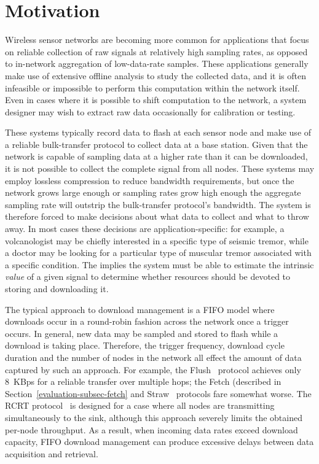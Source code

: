 \section{Motivation}
\label{lance-sec-motivation}

Wireless sensor networks are becoming more common for applications that focus
on reliable collection of raw signals at relatively high sampling rates, as
opposed to in-network aggregation of low-data-rate samples. These
applications generally make use of extensive offline analysis to study the
collected data, and it is often infeasible or impossible to perform this
computation within the network itself. Even in cases where it is possible to
shift computation to the network, a system designer may wish to extract raw
data occasionally for calibration or testing.

These systems typically record data to flash at each sensor node and make use
of a reliable bulk-transfer protocol to collect data at a base station. Given
that the network is capable of sampling data at a higher rate than it can be
downloaded, it is not possible to collect the complete signal from all nodes.
These systems may employ lossless compression to reduce bandwidth
requirements, but once the network grows large enough or sampling rates grow
high enough the aggregate sampling rate will outstrip the bulk-transfer
protocol's bandwidth. The system is therefore forced to make decisions about
what data to collect and what to throw away. In most cases these decisions
are application-specific: for example, a volcanologist may be chiefly
interested in a specific type of seismic tremor, while a doctor may be
looking for a particular type of muscular tremor associated with a specific
condition. The implies the system must be able to estimate the intrinsic
\textit{value} of a given signal to determine whether resources should be
devoted to storing and downloading it.

The typical approach to download management is a FIFO model where downloads
occur in a round-robin fashion across the network once a trigger occurs. In
general, new data may be sampled and stored to flash while a download is
taking place. Therefore, the trigger frequency, download cycle duration and
the number of nodes in the network all effect the amount of data captured by
such an approach. For example, the Flush~\cite{flush-sensys07} protocol
achieves only 8~KBps for a reliable transfer over multiple hops; the Fetch
(described in Section~\ref{evaluation-subsec-fetch} and
Straw~\cite{ggb-ipsn07} protocols fare somewhat worse. The RCRT
protocol~\cite{rcrt-sensys07} is designed for a case where all nodes are
transmitting simultaneously to the sink, although this approach severely
limits the obtained per-node throughput. As a result, when incoming data
rates exceed download capacity, FIFO download management can produce
excessive delays between data acquisition and retrieval.

